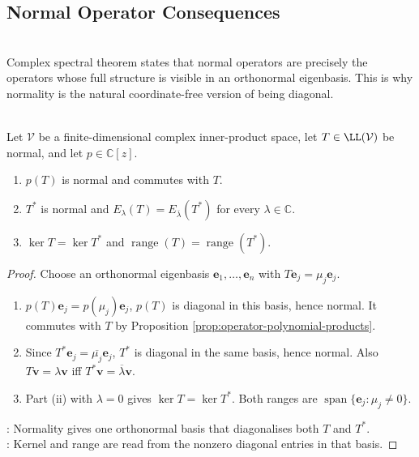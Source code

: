 \subsection{Normal Operator Consequences}

\begin{perspective} \label{per:normal-operators-coordinate-free-diagonal} \\
Complex spectral theorem states that normal operators are precisely the operators whose full structure is visible in an orthonormal eigenbasis. This is why normality is the natural coordinate-free version of being diagonal.
\end{perspective}

\begin{proposition} \label{prop:normal-polynomial-kernel-range-properties} \\
Let $\mathcal{V}$ be a finite-dimensional complex inner-product space, let $T\in\LL(\mathcal{V})$ be normal, and let $p\in\mathbb{C}[z]$.
\begin{enumerate}[label=(\roman*)]
\setlength{\itemsep}{0pt}
\item $p(T)$ is normal and commutes with $T$.
\item $T^*$ is normal and $E_{\lambda}(T)=E_{\overline{\lambda}}(T^*)$ for every $\lambda\in\mathbb{C}$.
\item $\ker T=\ker T^*$ and $\operatorname{range}(T)=\operatorname{range}(T^*)$.
\end{enumerate}
\begin{proof}
Choose an orthonormal eigenbasis $\mathbf{e}_1,\ldots,\mathbf{e}_n$ with $T\mathbf{e}_j=\mu_j\mathbf{e}_j$.
\begin{enumerate}[label=(\roman*)]
\setlength{\itemsep}{0pt}
\item $p(T)\mathbf{e}_j=p(\mu_j)\mathbf{e}_j$, $p(T)$ is diagonal in this basis, hence normal. It commutes with $T$ by Proposition \ref{prop:operator-polynomial-products}.
\item Since $T^*\mathbf{e}_j=\overline{\mu_j}\mathbf{e}_j$, $T^*$ is diagonal in the same basis, hence normal. Also $T\mathbf{v}=\lambda\mathbf{v}$ iff $T^*\mathbf{v}=\overline{\lambda}\mathbf{v}$.
\item Part (ii) with $\lambda=0$ gives $\ker T=\ker T^*$. Both ranges are $\operatorname{span}\{\mathbf{e}_j:\mu_j\neq0\}$.
\end{enumerate}
: Normality gives one orthonormal basis that diagonalises both $T$ and $T^*$.\\
: Kernel and range are read from the nonzero diagonal entries in that basis.
\end{proof}
\end{proposition}

